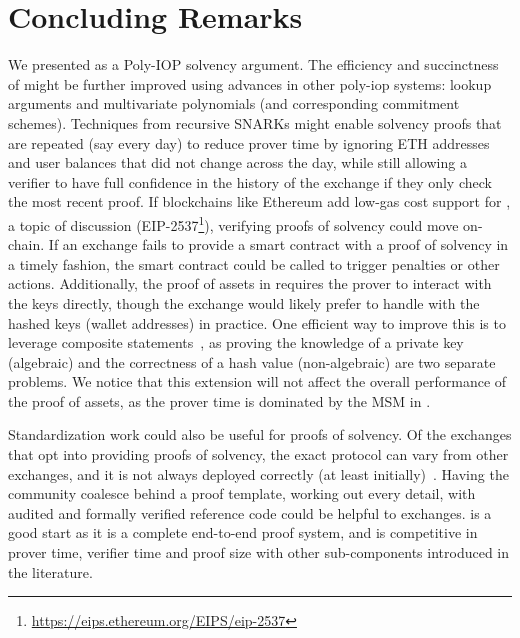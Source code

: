 \chapter{Concluding Remarks}

We presented \Sys as a Poly-IOP solvency argument. The efficiency and succinctness of \Sys might be further improved using advances in other poly-iop systems: lookup arguments and multivariate polynomials (and corresponding commitment schemes). Techniques from recursive SNARKs might enable solvency proofs that are repeated (say every day) to reduce prover time by ignoring ETH addresses and user balances that did not change across the day, while still allowing a verifier to have full confidence in the history of the exchange if they only check the most recent proof. If blockchains like Ethereum add low-gas cost support for \bls, a topic of discussion (EIP-2537\footnote{\url{https://eips.ethereum.org/EIPS/eip-2537}}), verifying proofs of solvency could move on-chain. If an exchange fails to provide a smart contract with a proof of solvency in a timely fashion, the smart contract could be called to trigger penalties or other actions. Additionally, the proof of assets in \Sys requires the prover to interact with the \secp keys directly, though the exchange would likely prefer to handle with the hashed keys (wallet addresses) in practice. One efficient way to improve this is to leverage composite statements~\cite{composite}, as proving the knowledge of a private key (algebraic) and the correctness of a hash value (non-algebraic) are two separate problems. We notice that this extension will not affect the overall performance of the proof of assets, as the prover time is dominated by the MSM in \secp. 

Standardization work could also be useful for proofs of solvency. Of the exchanges that opt into providing proofs of solvency, the exact protocol can vary from other exchanges, and it is not always deployed correctly (at least initially)~\cite{broken}. Having the community coalesce behind a proof template, working out every detail, with audited and formally verified reference code could be helpful to exchanges. \Sys is a good start as it is a complete end-to-end proof system, and is competitive in prover time, verifier time and proof size with other sub-components introduced in the literature.
